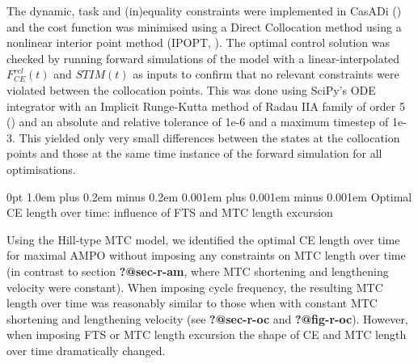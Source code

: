 \documentclass[
  11pt,
  a4paper]{article}
\makeatletter
\renewcommand{\section}{%
  \@startsection{section}{1}
    {0pt} 					%
    {1.0em plus 0.2em minus 0.2em} 	%
    {0.001em plus 0.001em minus 0.001em}    	%
    {\Large\bfseries\sffamily}%
}
\makeatother
\begin{document}
The dynamic, task and (in)equality constraints were implemented in
CasADi ()
and the cost function was minimised using a Direct Collocation method
using a nonlinear interior point method (IPOPT,
).
The optimal control solution was checked by running forward simulations
of the model with a linear-interpolated \(F_{CE}^{rel}(t)\) and
\(STIM(t)\) as inputs to confirm that no relevant constraints were
violated between the collocation points. This was done using SciPy's ODE
integrator with an Implicit Runge-Kutta method of Radau IIA family of
order 5 () and an absolute and relative tolerance of 1e-6 and a maximum
timestep of 1e-3. This yielded only very small differences between the
states at the collocation points and those at the same time instance of
the forward simulation for all optimisations.

\newpage{}

\renewcommand{\thesection}{S\arabic{section}}
\setcounter{section}{3}


\section{Optimal CE length over time: influence of FTS and MTC length
excursion}\label{optimal-ce-length-over-time-influence-of-fts-and-mtc-length-excursion}

Using the Hill-type MTC model, we identified the optimal CE length over
time for maximal AMPO without imposing any constraints on MTC length
over time (in contrast to section \textbf{?@sec-r-am}, where MTC
shortening and lengthening velocity were constant). When imposing cycle
frequency, the resulting MTC length over time was reasonably similar to
those when with constant MTC shortening and lengthening velocity (see
\textbf{?@sec-r-oc} and \textbf{?@fig-r-oc}). However, when imposing FTS
or MTC length excursion the shape of CE and MTC length over time
dramatically changed.
\end{document}
